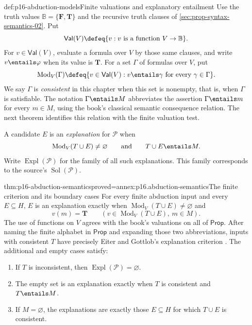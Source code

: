 \begin{hbdefinition}{def:p16-abduction-models}{Finite valuations and explanatory entailment}
Use the truth values \(\mathbb{B}=\{\mathbf{F},\mathbf{T}\}\) and the recursive
truth clauses of \cref{sec:prop-syntax-semantics-02}. Put
\[
 \mathsf{Val}(V)\defeq\{v:v\text{ is a function }V\to\mathbb{B}\}.
\]
For \(v\in\mathsf{Val}(V)\), evaluate a formula over \(V\) by those
same clauses, and write \(v\entails\varphi\) when its value is
\(\mathbf{T}\). For a set \(\Gamma\) of formulas over \(V\), put
\[
 \operatorname{Mod}_V(\Gamma)
   \defeq\{v\in\mathsf{Val}(V):
                  v\entails\gamma\text{ for every }\gamma\in\Gamma\}.
\]
We say \(\Gamma\) is \emph{consistent} in this chapter when this set
is nonempty, that is, when \(\Gamma\) is satisfiable. The notation
\(\Gamma\entails M\) abbreviates the assertion
\(\Gamma\entails m\) for every \(m\in M\), using the book's
classical semantic consequence relation. The next theorem identifies this
relation with the finite valuation test.

A candidate \(E\) is an \emph{explanation} for \(\mathcal P\) when
\[
 \operatorname{Mod}_V(T\cup E)\ne\varnothing
       \qquad\text{and}\qquad T\cup E\entails M.
\]
Write \(\operatorname{Expl}(\mathcal P)\) for the family of all such
explanations. This family corresponds to the source's
\(\operatorname{Sol}(\mathcal P)\).
\end{hbdefinition}

\begin{hbtheorem}{thm:p16-abduction-semantics}{proved=annex:p16.abduction-semantics}{The finite criterion and its boundary cases}
For every finite abduction input and every \(E\subseteq H\),
\(E\) is an explanation exactly when
\(\operatorname{Mod}_V(T\cup E)\ne\varnothing\) and
\[
 v(m)=\mathbf{T}\qquad
  (v\in\operatorname{Mod}_V(T\cup E),\ m\in M).
\]
The use of functions on \(V\) agrees with the book's valuations on all
of \(\mathsf{Prop}\). After naming the finite alphabet in \(\mathsf{Prop}\) and
expanding those two abbreviations, inputs with consistent \(T\) have
precisely Eiter and Gottlob's explanation criterion
\cite[defs.~2.1--2.2, manuscript pp.~9--10]{EiterGottlobAbductionManuscript}.
The additional and empty cases satisfy:
\begin{enumerate}
\item If \(T\) is inconsistent, then
      \(\operatorname{Expl}(\mathcal P)=\varnothing\).
\item The empty set is an explanation exactly when \(T\) is consistent
      and \(T\entails M\).
\item If \(M=\varnothing\), the explanations are exactly those
      \(E\subseteq H\) for which \(T\cup E\) is consistent.
\end{enumerate}
\end{hbtheorem}

